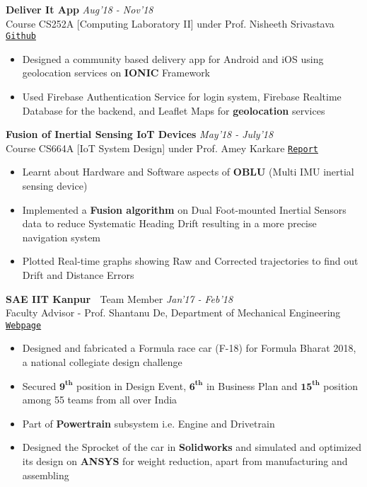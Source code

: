 \documentclass[10pt]{extarticle}
\begin{document}
\vspace{2mm}
\textbf{Deliver It App}
\hfill\hfill\textit{Aug'18 - Nov'18}\\
Course CS252A [Computing Laboratory II] under Prof. Nisheeth Srivastava
\hfill
\href{https://github.com/SahilDhull/252_project}{\texttt{Github}}
\begin{itemize}
\renewcommand\labelitemi{--}
\item Designed a community based delivery app for Android and iOS using geolocation services on \textbf{IONIC} Framework
\item Used Firebase Authentication Service for login system, Firebase Realtime Database for the backend, and Leaflet Maps for \textbf{geolocation} services
\end{itemize}
\vspace{2mm}
\textbf{Fusion of Inertial Sensing IoT Devices} \hfill\hfill\textit{May'18 - July'18}\\
Course CS664A [IoT System Design] under Prof. Amey Karkare
\hfill
\href{https://drive.google.com/open?id=1Ke4T3OCpIyz1n92X255i7DAlqgbJZLXJ}{\texttt{Report}}
\begin{itemize}
\renewcommand\labelitemi{--}
\item Learnt about Hardware and Software aspects of \textbf{OBLU} (Multi IMU inertial sensing device)
\item Implemented a \textbf{Fusion algorithm} on Dual Foot-mounted Inertial Sensors data to reduce Systematic Heading Drift resulting in a more precise navigation system
\item Plotted Real-time graphs showing Raw and Corrected trajectories to find out Drift and Distance Errors
\end{itemize}
\vspace{2mm}
\textbf{SAE IIT Kanpur \textbar \ }Team Member \hfill\hfill\textit{Jan'17 - Feb'18}\\Faculty Advisor - Prof. Shantanu De, Department of Mechanical Engineering
\hfill
\href{https://www.iitk.ac.in/ame/sae/}{\texttt{Webpage}}
\begin{itemize}
\renewcommand\labelitemi{--}
\item Designed and fabricated a Formula race car (F-18) for Formula Bharat 2018, a national collegiate design challenge
\item Secured $\mathbf{9^{th}}$ position in Design Event, $\mathbf{6^{th}}$ in Business Plan and $\mathbf{15^{th}}$ position among 55 teams from all over India
\item Part of \textbf{Powertrain} subsystem i.e. Engine and Drivetrain
\item Designed the Sprocket of the car in \textbf{Solidworks} and simulated and optimized its design on \textbf{ANSYS} for weight reduction, apart from manufacturing and assembling
\end{itemize}
\end{document}
